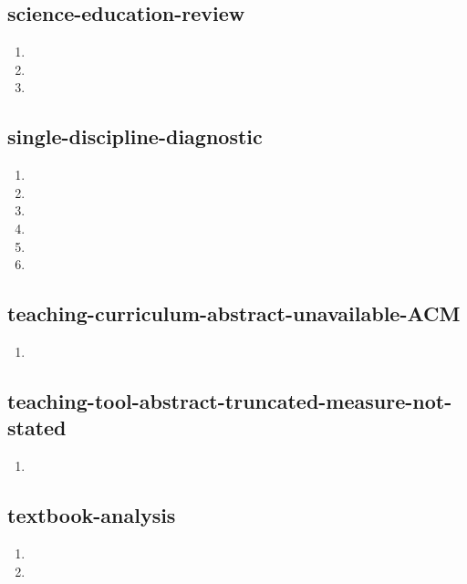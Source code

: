 \documentclass{article}
\begin{document}
\subsection{science-education-review}
\begin{enumerate}
\item {}
\item {}
\item {}
\end{enumerate}

\subsection{single-discipline-diagnostic}
\begin{enumerate}
\item {}
\item {}
\item {}
\item {}
\item {}
\item {}
\end{enumerate}

\subsection{teaching-curriculum-abstract-unavailable-ACM}
\begin{enumerate}
\item {}
\end{enumerate}

\subsection{teaching-tool-abstract-truncated-measure-not-stated}
\begin{enumerate}
\item {}
\end{enumerate}

\subsection{textbook-analysis}
\begin{enumerate}
\item {}
\item {}
\end{enumerate}
\end{document}
